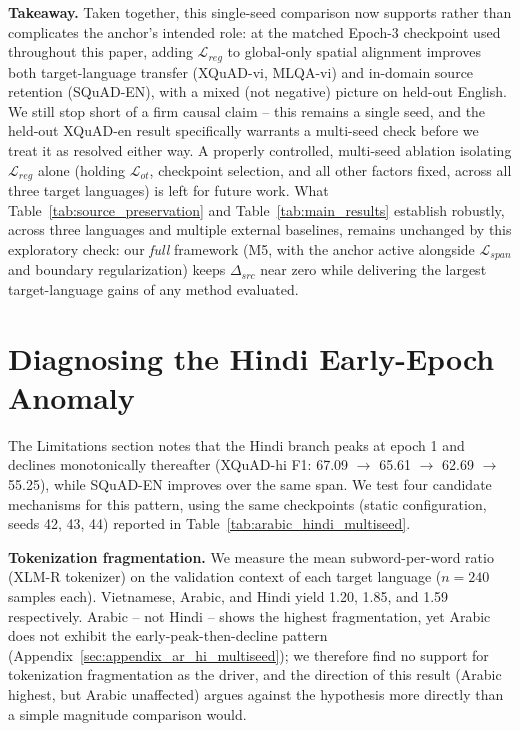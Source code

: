 \documentclass[11pt]{article}
\begin{document}
\textbf{Takeaway.} Taken together, this single-seed comparison now supports rather than complicates the anchor's intended role: at the matched Epoch-3 checkpoint used throughout this paper, adding $\mathcal{L}_{reg}$ to global-only spatial alignment improves both target-language transfer (XQuAD-vi, MLQA-vi) and in-domain source retention (SQuAD-EN), with a mixed (not negative) picture on held-out English. We still stop short of a firm causal claim -- this remains a single seed, and the held-out XQuAD-en result specifically warrants a multi-seed check before we treat it as resolved either way. A properly controlled, multi-seed ablation isolating $\mathcal{L}_{reg}$ alone (holding $\mathcal{L}_{ot}$, checkpoint selection, and all other factors fixed, across all three target languages) is left for future work. What Table~\ref{tab:source_preservation} and Table~\ref{tab:main_results} establish robustly, across three languages and multiple external baselines, remains unchanged by this exploratory check: our \emph{full} framework (M5, with the anchor active alongside $\mathcal{L}_{span}$ and boundary regularization) keeps $\Delta_{src}$ near zero while delivering the largest target-language gains of any method evaluated.

\section{Diagnosing the Hindi Early-Epoch Anomaly}
\label{sec:appendix_hindi_anomaly}

The Limitations section notes that the Hindi branch peaks at epoch 1 and declines monotonically thereafter (XQuAD-hi F1: 67.09 $\rightarrow$ 65.61 $\rightarrow$ 62.69 $\rightarrow$ 55.25), while SQuAD-EN improves over the same span. We test four candidate mechanisms for this pattern, using the same checkpoints (static configuration, seeds 42, 43, 44) reported in Table~\ref{tab:arabic_hindi_multiseed}.

\textbf{Tokenization fragmentation.} We measure the mean subword-per-word ratio (XLM-R tokenizer) on the validation context of each target language ($n=240$ samples each). Vietnamese, Arabic, and Hindi yield 1.20, 1.85, and 1.59 respectively. Arabic -- not Hindi -- shows the highest fragmentation, yet Arabic does not exhibit the early-peak-then-decline pattern (Appendix~\ref{sec:appendix_ar_hi_multiseed}); we therefore find no support for tokenization fragmentation as the driver, and the direction of this result (Arabic highest, but Arabic unaffected) argues against the hypothesis more directly than a simple magnitude comparison would.
\end{document}
